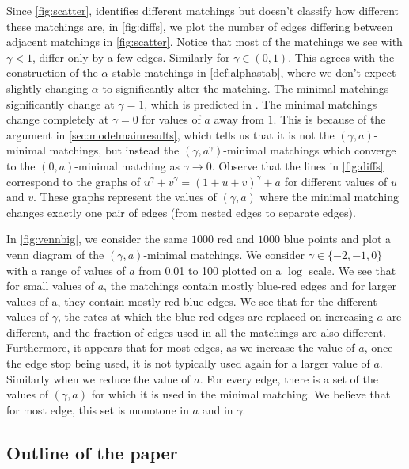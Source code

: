 \documentclass{article}
\begin{document}
Since \cref{fig:scatter}, identifies different matchings but doesn't
classify how different these matchings are, in \cref{fig:diffs}, we
plot the number of edges differing between adjacent matchings in
\cref{fig:scatter}. Notice that most of the matchings we see with
$\gamma<1$, differ only by a few edges. Similarly for
$\gamma\in(0,1)$. This agrees with the construction of the $\alpha$
stable matchings in \cref{def:alphastab}, where we don't expect
slightly changing $\alpha$ to significantly alter the matching. The minimal
matchings significantly change at $\gamma=1$, which is
predicted in \cite[Theorem 2,3]{minimal}. The minimal matchings change
completely at $\gamma=0$ for values of $a$ away from $1$. This is
because of the argument in
\cref{sec:modelmainresults}, which tells us that it is not the
$(\gamma,a)$-minimal matchings, but instead the $(\gamma,a^\gamma)$-minimal
matchings which converge to the $(0,a)$-minimal matching as $\gamma\rightarrow
0$. Observe that the lines in \cref{fig:diffs} correspond to the
graphs of $u^\gamma + v^\gamma = (1+u+v)^\gamma + a$ for different
values of $u$ and $v$. These graphs represent the values of
$(\gamma,a)$ where the minimal matching changes exactly one pair of
edges (from nested edges to separate edges).



In \cref{fig:vennbig}, we consider the same $1000$ red and $1000$ blue points
and plot a venn diagram of the $(\gamma,a)$-minimal matchings. We
consider $\gamma\in\{-2,-1,0\}$ with a range of values of $a$ from 0.01 to 100 plotted on a
$\log$ scale. We see that for small values of $a$, the matchings
contain mostly blue-red edges and for larger values of a, they contain
mostly red-blue edges. We see that for the different values of
$\gamma$, the rates at which the blue-red edges are replaced on
increasing $a$ are different, and the fraction of edges used in all
the matchings are also different.
Furthermore, it appears that for most edges,
as we increase the value of $a$, once the edge stop being used, it is
not typically used again for a larger value of $a$. Similarly when we
reduce the value of $a$. For every edge, there is a set of the values
of $(\gamma,a)$ for which it is used in the minimal matching. We
believe that for most edge, this set is monotone in $a$ and in
$\gamma$.

\subsection{Outline of the paper}
\end{document}
